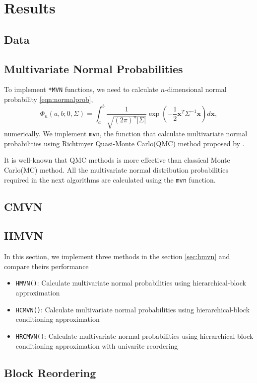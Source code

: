 \section{Results}

\subsection{Data}


\subsection{Multivariate Normal Probabilities} 

To implement \texttt{*MVN} functions, we need to calculate $n$-dimensional normal probability \eqref{eqn:normalprob},
$$
\Phi_n(a, b; 0, \Sigma) = \int_a^b \frac{1}{\sqrt{(2\pi)^n |\Sigma|}} \exp\left( -\frac{1}{2} \mathbf{x}^T \Sigma^{-1} \mathbf{x} \right) d\mathbf{x},
$$ 
numerically. We implement \texttt{mvn}, the function that calculate multivariate normal probabilities using Richtmyer Quasi-Monte Carlo(QMC) method proposed by \citet{genz2009computation}.


It is well-known that QMC methods is more effective than classical Monte Carlo(MC) method. All the multivariate normal distribution probabilities required in the next algorithms are calculated using the \texttt{mvn} function.

\subsection{CMVN}


\subsection{HMVN}

In this section, we implement three methods in the section \ref{sec:hmvn} and compare theirs performance
\begin{itemize}
    \item \texttt{HMVN()}: Calculate multivariate normal probabilities using hierarchical-block approximation
    \item \texttt{HCMVN()}: Calculate multivariate normal probabilities using hierarchical-block conditioning approximation
    \item \texttt{HRCMVN()}: Calculate multivariate normal probabilities using hierarchical-block conditioning approximation with univarite reordering
\end{itemize}

\subsection{Block Reordering}
